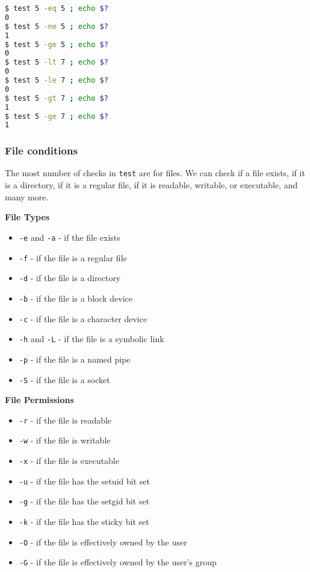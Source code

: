 \begin{lstlisting}[language=bash]
$ test 5 -eq 5 ; echo $?
0
$ test 5 -ne 5 ; echo $?
1
$ test 5 -ge 5 ; echo $?
0
$ test 5 -lt 7 ; echo $?
0
$ test 5 -le 7 ; echo $?
0
$ test 5 -gt 7 ; echo $?
1
$ test 5 -ge 7 ; echo $?
1
\end{lstlisting}

\subsubsection{File conditions}

The most number of checks in \lstinline|test| are for files. We can check if a file exists, if it is a directory, if it is a regular file, if it is readable, writable, or executable, and many more.

\textbf{File Types}

\begin{itemize}
    \item \lstinline|-e| and \lstinline|-a| - if the file exists
    \item \lstinline|-f| - if the file is a regular file
    \item \lstinline|-d| - if the file is a directory
    \item \lstinline|-b| - if the file is a block device
    \item \lstinline|-c| - if the file is a character device
    \item \lstinline|-h| and \lstinline|-L| - if the file is a symbolic link
    \item \lstinline|-p| - if the file is a named pipe
      \item \lstinline|-S| - if the file is a socket
\end{itemize}

\textbf{File Permissions}

\begin{itemize}
    \item \lstinline|-r| - if the file is readable
    \item \lstinline|-w| - if the file is writable
    \item \lstinline|-x| - if the file is executable
    \item \lstinline|-u| - if the file has the setuid bit set
    \item \lstinline|-g| - if the file has the setgid bit set
    \item \lstinline|-k| - if the file has the sticky bit set
    \item \lstinline|-O| - if the file is effectively owned by the user
    \item \lstinline|-G| - if the file is effectively owned by the user's group
\end{itemize}

